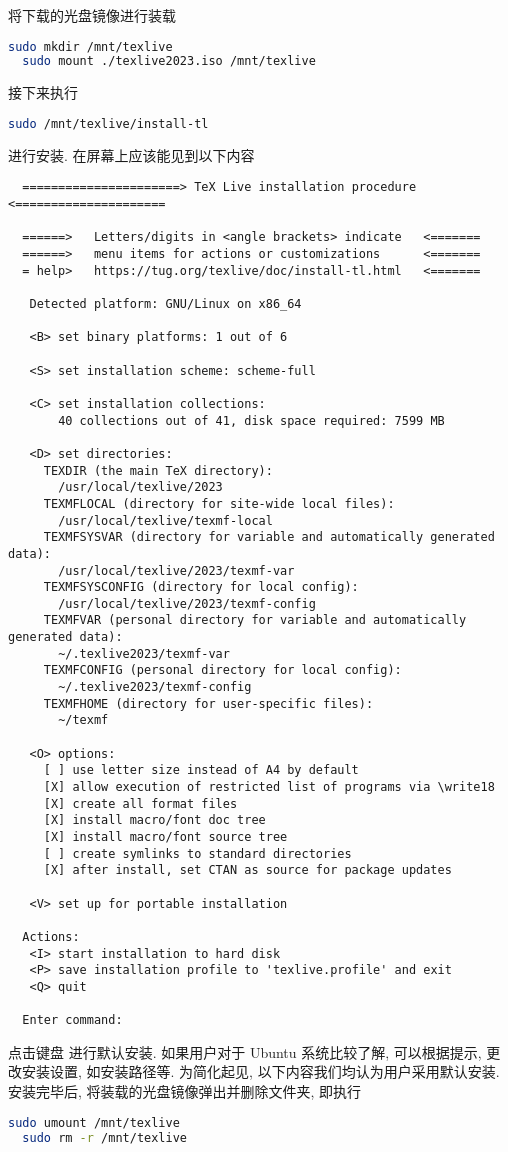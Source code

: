 将下载的光盘镜像进行装载
\begin{lstlisting}[language = bash]
  sudo mkdir /mnt/texlive
  sudo mount ./texlive2023.iso /mnt/texlive
\end{lstlisting}
接下来执行
\begin{lstlisting}[language = bash]
  sudo /mnt/texlive/install-tl
\end{lstlisting}
进行安装.
在屏幕上应该能见到以下内容
\begin{lstlisting}
  ======================> TeX Live installation procedure <=====================
  
  ======>   Letters/digits in <angle brackets> indicate   <=======
  ======>   menu items for actions or customizations      <=======
  = help>   https://tug.org/texlive/doc/install-tl.html   <=======
  
   Detected platform: GNU/Linux on x86_64
   
   <B> set binary platforms: 1 out of 6
  
   <S> set installation scheme: scheme-full
  
   <C> set installation collections:
       40 collections out of 41, disk space required: 7599 MB
  
   <D> set directories:
     TEXDIR (the main TeX directory):
       /usr/local/texlive/2023
     TEXMFLOCAL (directory for site-wide local files):
       /usr/local/texlive/texmf-local
     TEXMFSYSVAR (directory for variable and automatically generated data):
       /usr/local/texlive/2023/texmf-var
     TEXMFSYSCONFIG (directory for local config):
       /usr/local/texlive/2023/texmf-config
     TEXMFVAR (personal directory for variable and automatically generated data):
       ~/.texlive2023/texmf-var
     TEXMFCONFIG (personal directory for local config):
       ~/.texlive2023/texmf-config
     TEXMFHOME (directory for user-specific files):
       ~/texmf
  
   <O> options:
     [ ] use letter size instead of A4 by default
     [X] allow execution of restricted list of programs via \write18
     [X] create all format files
     [X] install macro/font doc tree
     [X] install macro/font source tree
     [ ] create symlinks to standard directories
     [X] after install, set CTAN as source for package updates
  
   <V> set up for portable installation
  
  Actions:
   <I> start installation to hard disk
   <P> save installation profile to 'texlive.profile' and exit
   <Q> quit
  
  Enter command: 
\end{lstlisting}
点击键盘  进行默认安装.
如果用户对于 Ubuntu 系统比较了解,
可以根据提示,
更改安装设置,
如安装路径等.
为简化起见,
以下内容我们均认为用户采用默认安装.
安装完毕后,
将装载的光盘镜像弹出并删除文件夹,
即执行
\begin{lstlisting}[language = bash]
  sudo umount /mnt/texlive
  sudo rm -r /mnt/texlive
\end{lstlisting}

